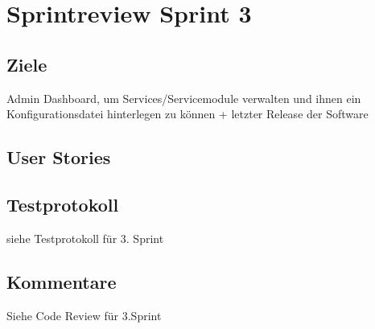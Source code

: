 \chapter{Sprintreview Sprint 3}

\section{Ziele}
Admin Dashboard, um Services/Servicemodule 
verwalten und ihnen ein Konfigurationsdatei hinterlegen zu können +
 letzter Release der Software

\section{User Stories}





\newpage

\section{Testprotokoll}

siehe Testprotokoll für 3. Sprint

\section{Kommentare}

Siehe Code Review für 3.Sprint
